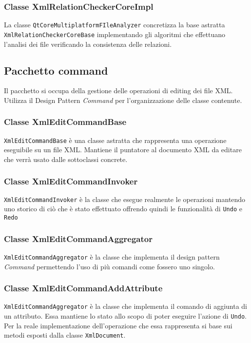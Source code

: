 	\subsubsection{Classe XmlRelationCheckerCoreImpl}
		La classe \texttt{QtCoreMultiplatformFIleAnalyzer} concretizza la base astratta \texttt{XmlRelationCheckerCoreBase} implementando gli algoritmi che effettuano l'analisi dei file verificando la consistenza delle relazioni.

\subsection{Pacchetto command}
Il pacchetto si occupa della gestione delle operazioni di editing dei file XML. Utilizza il Design Pattern \textit{Command} per l'organizzazione delle classe contenute.

	\subsubsection{Classe XmlEditCommandBase}
		\texttt{XmlEditCommandBase} è una classe astratta che rappresenta una operazione eseguibile su un file XML. Mantiene il puntatore al documento XML da editare che verrà usato dalle sottoclassi concrete.
		
	\subsubsection{Classe XmlEditCommandInvoker}
		\texttt{XmlEditCommandInvoker} è la classe che esegue realmente le operazioni mantendo uno storico di ciò che è stato effettuato offrendo quindi le funzionalità di \texttt{Undo} e \texttt{Redo}

	\subsubsection{Classe XmlEditCommandAggregator}
		\texttt{XmlEditCommandAggregator} è la classe che implementa il design pattern \textit{Command} permettendo l'uso di più comandi come fossero uno singolo.
		
	\subsubsection{Classe XmlEditCommandAddAttribute}
		\texttt{XmlEditCommandAggregator} è la classe che implementa il comando di aggiunta di un attributo. Essa mantiene lo stato allo scopo di poter eseguire l'azione di \texttt{Undo}. Per la reale implementazione dell'operazione che essa rappresenta si base sui metodi esposti dalla classe \texttt{XmlDocument}.
		
